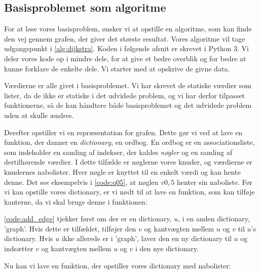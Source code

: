 \subsection{Basisproblemet som algoritme}
For at løse vores basisproblem, ønsker vi at opstille en algoritme, som kan finde den vej gennem grafen, der giver det største resultat. Vores algoritme vil tage udgangspunkt i \autoref{alg:dijkstra}. Koden i følgende afsnit er skrevet i Python 3. Vi deler vores kode op i mindre dele, for at give et bedre overblik og for bedre at kunne forklare de enkelte dele. Vi starter med at opskrive de givne data. 



Værdierne er alle givet i basisproblemet. Vi har skrevet de statiske værdier som lister, da de ikke er statiske i det udvidede problem, og vi har derfor tilpasset funktionerne, så de kan håndtere både basisproblemet og det udvidede problem uden at skulle ændres. 

Derefter opstiller vi en repræsentation for grafen. Dette gør vi ved at lave en funktion, der danner en \emph{dictionary}, en ordbog. En ordbog er en associationsliste, som indeholder en samling af indekser, der kaldes \emph{nøgler} og en samling af dertilhørende værdier. I dette tilfælde er nøglerne vores knuder, og
værdierne er knudernes nabolister. Hver nøgle er knyttet til en enkelt værdi og kan hente denne. Det ses eksempelvis i \autoref{code:q05}, at nøglen $v0,5$ henter sin naboliste.
Før vi kan opstille vores dictionary, er vi nødt til at lave en funktion, som kan tilføje kanterne, da vi skal bruge denne i funktionen:



\autoref{code:add_edge} tjekker først om der er en dictionary, $u$, i en anden dictionary, 'graph'. Hvis dette er tilfældet, tilføjer den $v$ og kantvægten mellem $u$ og $v$ til  $u$'s dictionary. Hvis $u$ ikke allerede er i 'graph', laver den en ny dictionary til $u$ og indsætter $v$ og kantvægten mellem $u$ og $v$ i den nye dictionary.

Nu kan vi lave en funktion, der opstiller vores dictionary med nabolister:



